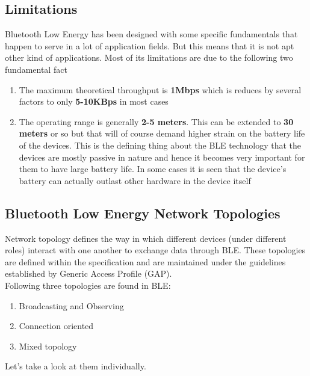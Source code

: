 \subsection{Limitations}
Bluetooth Low Energy has been designed with some specific fundamentals that happen to serve in a lot of application fields. But this means that it is not apt other kind of applications. Most of its limitations are due to the following two fundamental fact
\begin{enumerate}
	\item The maximum theoretical throughput is \textbf{1Mbps} which is reduces by several factors to only \textbf{5-10KBps} in most cases
	\item The operating range is generally \textbf{2-5 meters}. This can be extended to \textbf{30 meters} or so but that will of course demand higher strain on the battery life of the devices. This is the defining thing about the BLE technology that the devices are mostly passive in nature and hence it becomes very important for them to have large battery life. In some cases it is seen that the device’s battery can actually outlast other hardware in the device itself
\end{enumerate}
\subsection{Bluetooth Low Energy Network Topologies}
Network topology defines the way in which different devices (under different roles) interact with one another to exchange data through BLE. These topologies are defined within the specification and are maintained under the guidelines established by Generic Access Profile (GAP).\\
Following three topologies are found in BLE:
\begin{enumerate}
	\item Broadcasting and Observing
	\item Connection oriented
	\item Mixed topology
\end{enumerate}
Let’s take a look at them individually.
